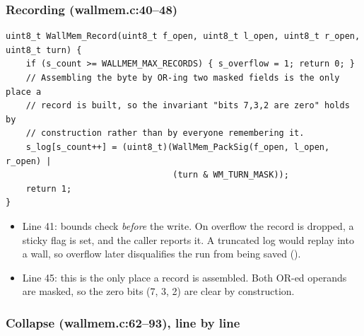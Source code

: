 \documentclass[11pt,a4paper]{article}
\newcommand{\file}[1]{\textsf{\detokenize{#1}}}
\theoremstyle{plain}
\theoremstyle{definition}
\begin{document}
\subsubsection{Recording (\textsf{wallmem.c:40--48})}

\begin{lstlisting}[firstnumber=40]
uint8_t WallMem_Record(uint8_t f_open, uint8_t l_open, uint8_t r_open, uint8_t turn) {
    if (s_count >= WALLMEM_MAX_RECORDS) { s_overflow = 1; return 0; }
    // Assembling the byte by OR-ing two masked fields is the only place a
    // record is built, so the invariant "bits 7,3,2 are zero" holds by
    // construction rather than by everyone remembering it.
    s_log[s_count++] = (uint8_t)(WallMem_PackSig(f_open, l_open, r_open) |
                                 (turn & WM_TURN_MASK));
    return 1;
}
\end{lstlisting}

\begin{itemize}
  \item Line 41: bounds check \emph{before} the write. On overflow the record
        is dropped, a sticky flag is set, and the caller reports it. A
        truncated log would replay into a wall, so overflow later
        disqualifies the run from being saved (\file{solver.c:645}).
  \item Line 45: this is the only place a record is assembled. Both OR-ed
        operands are masked, so the zero bits (7, 3, 2) are clear by
        construction.
\end{itemize}

\subsubsection{Collapse (\textsf{wallmem.c:62--93}), line by line}
\end{document}
